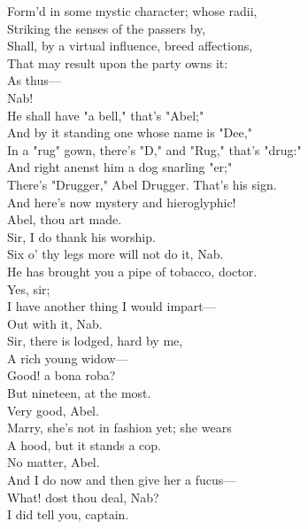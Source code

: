 \documentclass[a4paper,oneside]{memoir}
\begin{document}
\begin{drama*}
Form'd in some mystic character; whose radii,\\
Striking the senses of the passers by,\\
Shall, by a virtual influence, breed affections,\\
That may result upon the party owns it:\\
As thus---\\
\facespeaks {} Nab!\\
\subtlespeaks {} He shall have "a bell," that's "Abel;"\\
And by it standing one whose name is "Dee,"\\
In a "rug" gown, there's "D," and "Rug," that's "drug:"\\
And right anenst him a dog snarling "er;"\\
There's "Drugger," Abel Drugger. That's his sign.\\
And here's now mystery and hieroglyphic!\\
\facespeaks Abel, thou art made.\\
\druggerspeaks {} Sir, I do thank his worship.\\
\facespeaks Six o' thy legs more will not do it, Nab.\\
He has brought you a pipe of tobacco, doctor.\\
\druggerspeaks Yes, sir;\\
I have another thing I would impart---\\
\facespeaks Out with it, Nab.\\
\druggerspeaks {} Sir, there is lodged, hard by me,\\
A rich young widow---\\
\facespeaks {} Good! a bona roba?\\
\druggerspeaks But nineteen, at the most.\\
\facespeaks {} Very good, Abel.\\
\druggerspeaks Marry, she's not in fashion yet; she wears\\
A hood, but it stands a cop.\\
\facespeaks {} No matter, Abel.\\
\druggerspeaks And I do now and then give her a fucus---\\
\facespeaks What! dost thou deal, Nab?\\
\subtlespeaks {} I did tell you, captain.\\

\end{drama*}
\end{document}
